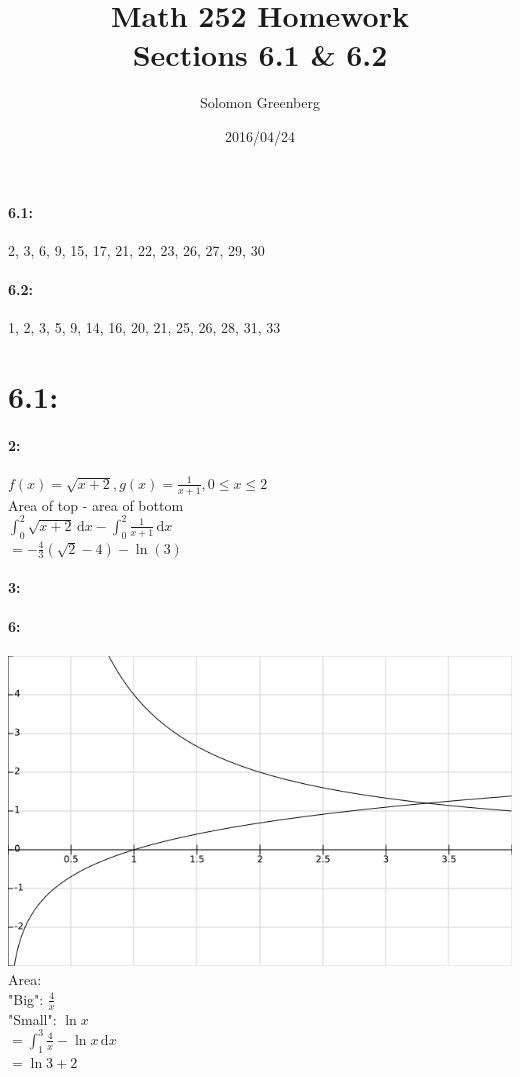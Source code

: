 \documentclass[12pt]{article}
\title{Math 252 Homework\\
\large Sections 6.1 \& 6.2}
\date{2016/04/24}
\author{Solomon Greenberg}
\newcommand{\dx}{\mathrm{d}x}
\begin{document}
    \newpage
    \paragraph*{6.1:} 2, 3, 6, 9, 15, 17, 21, 22, 23, 26, 27, 29, 30
    \paragraph*{6.2:} 1, 2, 3, 5, 9, 14, 16, 20, 21, 25, 26, 28, 31, 33

    \section*{6.1:}
    \paragraph*{2:\\}
    $f(x) = \sqrt{x + 2}, g(x) = \frac{1}{x+1}, 0 \leq x \leq 2$\\
    Area of top - area of bottom\\
    $\int_{0}^{2} \! \sqrt{x + 2} \, \dx - \int_{0}^{2} \! \frac{1}{x+1} \, \dx$\\
    $= -\frac{4}{3}(\sqrt{2} - 4) - \ln(3)$\\
    \paragraph*{3:\\}

    \paragraph*{6:\\}
    \includegraphics[scale=.666]{6.png}\\
    Area:\\
    "Big": $\frac{4}{x}$\\
    "Small": $\ln{x}$\\
    $=\int_{1}^{3}\! \frac{4}{x} - \ln{x} \, \dx$\\
    $=\ln{3} + 2$\\
\end{document}
